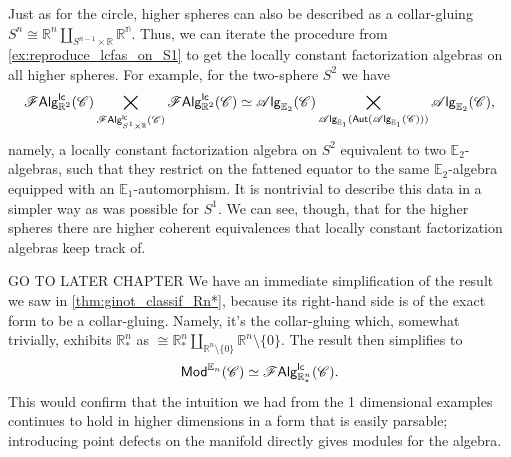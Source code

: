 \documentclass[../text]{subfiles}
\begin{document}
\begin{example}\label{ex:lcfas_on_S^n}
    Just as for the circle, higher spheres can also be described as a collar-gluing $S^n \cong \mathbb{R}^n \coprod_{S^{n-1} \times \mathbb{R}} \mathbb{R^n}$. Thus, we can iterate the procedure from \cref{ex:reproduce_lcfas_on_S1} to get the locally constant factorization algebras on all higher spheres. For example, for the two-sphere $S^2$ we have
    \begin{equation}
        \mathscr{F} \mathsf{Alg}^{\mathsf{lc}}_{\mathbb{R}^2}(\mathscr{C}) \bigtimes_{\mathscr{F} \mathsf{Alg}^{\mathsf{lc}}_{S^1 \times \mathbb{R}}(\mathscr{C})} \mathscr{F} \mathsf{Alg}^{\mathsf{lc}}_{\mathbb{R}^2}(\mathscr{C}) \simeq \mathscr{A} \mathsf{lg}_{\mathbb{E}_2}(\mathscr{C}) \bigtimes_{\mathscr{A} \mathsf{lg}_{\mathbb{E}_1}( \mathsf{Aut} (\mathscr{A} \mathsf{lg}_{\mathbb{E}_1} (\mathscr{C}))) } \mathscr{A} \mathsf{lg}_{\mathbb{E}_2} (\mathscr{C}),
    \end{equation}
    namely, a locally constant factorization algebra on $S^2$ equivalent to two $\mathbb{E}_2$-algebras, such that they restrict on the fattened equator to the same $\mathbb{E}_2$-algebra equipped with an $\mathbb{E}_1$-automorphism. It is nontrivial to describe this data in a simpler way as was possible for $S^1$. We can see, though, that for the higher spheres there are higher coherent equivalences that locally constant factorization algebras keep track of.
\end{example}

\begin{example}{\color{red} GO TO LATER CHAPTER}
    We have an immediate simplification of the result we saw in \cref{thm:ginot_classif_Rn*}, because its right-hand side is of the exact form to be a collar-gluing. Namely, it's the collar-gluing which, somewhat trivially, exhibits $\mathbb{R}^n_*$ as $ \cong \mathbb{R}^n_* \coprod_{\mathbb{R}^n \setminus \{0\}} \mathbb{R}^n \setminus \{0\}$. The result then simplifies to
    \begin{equation}
        \mathsf{Mod}^{\mathbb{E}_n} (\mathscr{C}) \simeq \mathscr{F} \mathsf{Alg}^{\mathsf{lc}}_{\mathbb{R}^n_*} (\mathscr{C}). 
    \end{equation}
    This would confirm that the intuition we had from the 1 dimensional examples continues to hold in higher dimensions in a form that is easily parsable; introducing point defects on the manifold directly gives modules for the algebra.
\end{example}
\end{document}
